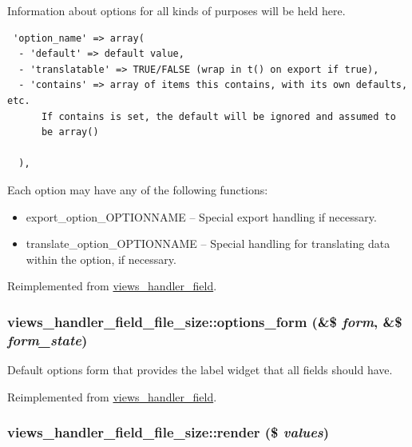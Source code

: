 Information about options for all kinds of purposes will be held here. 

\begin{Code}\begin{verbatim} 'option_name' => array(
  - 'default' => default value,
  - 'translatable' => TRUE/FALSE (wrap in t() on export if true),
  - 'contains' => array of items this contains, with its own defaults, etc.
      If contains is set, the default will be ignored and assumed to
      be array()

  ),
\end{verbatim}
\end{Code}

 Each option may have any of the following functions:\begin{itemize}
\item export\_\-option\_\-OPTIONNAME -- Special export handling if necessary.\item translate\_\-option\_\-OPTIONNAME -- Special handling for translating data within the option, if necessary. \end{itemize}


Reimplemented from \hyperlink{classviews__handler__field_64c69a8a3697603f8283405071c25b76}{views\_\-handler\_\-field}.\hypertarget{classviews__handler__field__file__size_b701c7b97e6688971ddfdcd7e9539262}{
\subsubsection[{options\_\-form}]{\setlength{\rightskip}{0pt plus 5cm}views\_\-handler\_\-field\_\-file\_\-size::options\_\-form (\&\$ {\em form}, \/  \&\$ {\em form\_\-state})}}
\label{classviews__handler__field__file__size_b701c7b97e6688971ddfdcd7e9539262}


Default options form that provides the label widget that all fields should have. 

Reimplemented from \hyperlink{classviews__handler__field_0435d161922b7b4b84f02a2e79bb947a}{views\_\-handler\_\-field}.\hypertarget{classviews__handler__field__file__size_9ceb28e958ee939634f1c91e28b8579c}{
\subsubsection[{render}]{\setlength{\rightskip}{0pt plus 5cm}views\_\-handler\_\-field\_\-file\_\-size::render (\$ {\em values})}}
\label{classviews__handler__field__file__size_9ceb28e958ee939634f1c91e28b8579c}


